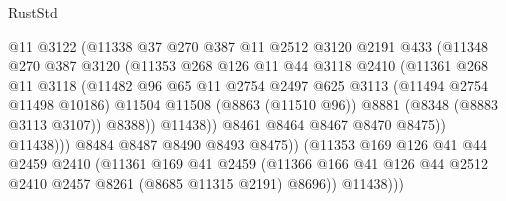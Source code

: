 \begin{lexlean}{RustStd}
\begin{coremodule}
{\begin{coremodule}
{{{{{{{{{{{{{{{{{{{{{{{{{{{{{{{{{{{{{{{{{{{{{{{{{{                              @11
                              @3122
                              (@11338
                                @37
                                @270
                                @387
                                @11
                                @2512
                                @3120
                                @2191
                                @433
                                (@11348
                                  @270
                                  @387
                                  @3120
                                  (@11353
                                    @268
                                    @126
                                    @11
                                    @44
                                    @3118
                                    @2410
                                    (@11361
                                      @268
                                      @11
                                      @3118
                                      (@11482
                                        @96
                                        @65
                                        @11
                                        @2754
                                        @2497
                                        @625
                                        @3113
                                        (@11494 @2754 @11498 @10186)
                                        @11504
                                        @11508
                                        (@8863 (@11510 @96))
                                        @8881
                                        (@8348 (@8883 @3113 @3107))
                                        @8388))
                                    @11438))
                                @8461
                                @8464
                                @8467
                                @8470
                                @8475))
                            @11438)))
                      @8484
                      @8487
                      @8490
                      @8493
                      @8475))
                  (@11353
                    @169
                    @126
                    @41
                    @44
                    @2459
                    @2410
                    (@11361
                      @169
                      @41
                      @2459
                      (@11366 @166 @41 @126 @44 @2512 @2410 @2457 @8261 (@8685 @11315 @2191) @8696))
                    @11438)))
}}}}}}}}}}}}}}}}}}}}}}}}}}}}}}}}}}}}}}}}}}}}}}}}}}
\end{coremodule}}
\end{coremodule}
\end{lexlean}
